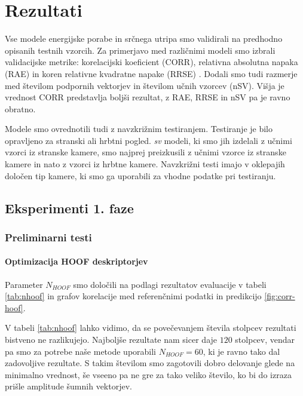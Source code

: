 \chapter{Rezultati}\label{sec:rezultati}
Vse modele energijske porabe in srčnega utripa smo validirali na predhodno opisanih testnih vzorcih. Za primerjavo med različnimi modeli smo izbrali validacijske metrike: korelacijski koeficient (CORR), relativna absolutna napaka (RAE) in koren relativne kvadratne napake (RRSE) \cite{witten2005data}. Dodali smo tudi razmerje med številom podpornih vektorjev in številom učnih vzorcev (nSV). Višja je vrednost CORR predstavlja boljši rezultat, z RAE, RRSE in nSV pa je ravno obratno.

Modele smo ovrednotili tudi z navzkrižnim testiranjem. Testiranje je bilo opravljeno za stranski ali hrbtni pogled. \textit{sv} modeli, ki smo jih izdelali z učnimi vzorci iz stranske kamere, smo najprej preizkusili z učnimi vzorce iz stranske kamere in nato z vzorci iz hrbtne kamere. Navzkrižni testi imajo v oklepajih določen tip kamere, ki smo ga uporabili za vhodne podatke pri testiranju.
















\section{Eksperimenti 1. faze}


\subsection{Preliminarni testi}

\subsubsection{Optimizacija HOOF deskriptorjev}\label{sec:rezultati-optimizacija-hoof}
Parameter $N_{HOOF}$ smo določili na podlagi rezultatov evaluacije v tabeli \ref{tab:nhoof} in grafov korelacije med referenčnimi podatki in predikcijo \ref{fig:corr-hoof}.

V tabeli \ref{tab:nhoof} lahko vidimo, da se povečevanjem števila stolpcev rezultati bistveno ne razlikujejo. Najboljše rezultate nam sicer daje $120$ stolpcev, vendar pa smo za potrebe naše metode uporabili $N_{HOOF}=60$, ki je ravno tako dal zadovoljive rezultate. S takim številom smo zagotovili dobro delovanje glede na minimalno vrednost, še vseeno pa ne gre za tako veliko število, ko bi do izraza prišle amplitude šumnih vektorjev.

